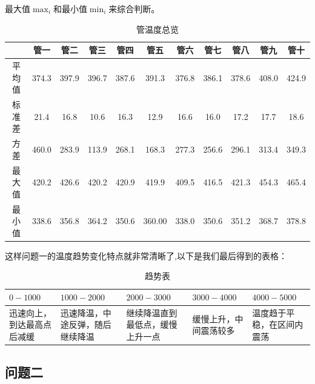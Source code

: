         最大值$\max_i$和最小值$\min_i$来综合判断。
        \begin{table}[H]
            \centering
            \begin{tabular}{ c|c|c|c|c|c|c|c|c|c|c  }
                \hline
                &管一&管二&管三&管四&管五&管六&管七&管八&管九&管十\\
                \hline
                平均值&374.3&  397.9& 396.7  &387.6 & 391.3 & 376.8  &386.1 & 378.6 & 408.0 & 424.9\\
                标准差&21.4 &  16.8 &  10.6 &  16.3 &  12.9 &  16.6  & 16.0  & 17.2 & 17.7  & 18.6 \\
                方差  &460.0& 283.9 & 113.9  &268.1 & 168.3 & 277.3 & 256.6 & 296.1 & 313.4 & 349.3\\
                最大值&420.2& 426.6 & 420.2 & 420.9 & 419.9 & 409.5 & 416.5 & 421.3 & 454.3 & 465.4\\
                最小值&338.6& 356.8 & 364.2 & 350.6 & 360.00& 338.0& 350.6 & 351.2 & 368.7 & 378.8 \\
                \hline
            \end{tabular}
            \caption{管温度总览}
        \end{table}
        这样问题一的温度趋势变化特点就非常清晰了,以下是我们最后得到的表格：
        \begin{table}[H]
            \centering
            \begin{tabular}{ |p{2.5cm}<{\centering}|p{2.5cm}<{\centering}|p{2.5cm}<{\centering}|p{2.5cm}<{\centering}|p{2.5cm}<{\centering}|  }
                \hline
                $0-1000$&$1000-2000$&$2000-3000$&$3000-4000$&$4000-5000$\\
                \hline
                迅速向上，到达最高点后减缓&
                迅速降温，中途反弹，随后继续降温&
                继续降温直到最低点，缓慢上升一点&
                缓慢上升，中间震荡较多&
                温度趋于平稳，在区间内震荡\\
                \hline
            \end{tabular}
            \caption{趋势表}
        \end{table}


    \subsection{问题二}

